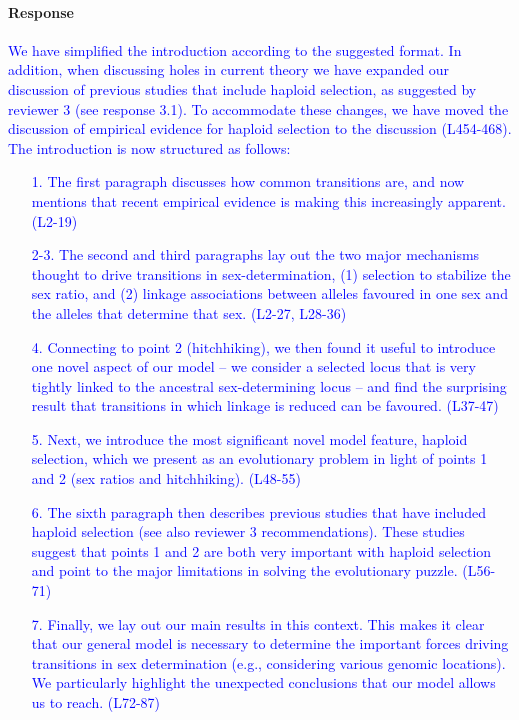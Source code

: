 \documentclass[10pt,letterpaper]{article}
\begin{document}
\noindent\paragraph{Response}
\textcolor{blue}{
We have simplified the introduction according to the suggested format. In addition, when discussing holes in current theory we have expanded our discussion of previous studies that include haploid selection, as suggested by reviewer 3 (see response 3.1). 
To accommodate these changes, we have moved the discussion of empirical evidence for haploid selection to the discussion (L454-468). The introduction is now structured as follows:
\begin{enumerate}
\item[1.]{The first paragraph discusses how common transitions are, and now mentions that recent empirical evidence is making this increasingly apparent. (L2-19)}
\item[2-3.]{The second and third paragraphs lay out the two major mechanisms thought to drive transitions in sex-determination, (1) selection to stabilize the sex ratio, and (2) linkage associations between alleles favoured in one sex and the alleles that determine that sex. (L2-27, L28-36) }
\item[4.]{Connecting to point 2 (hitchhiking), we then found it useful to introduce one novel aspect of our model -- we consider a selected locus that is very tightly linked to the ancestral sex-determining locus -- and find the surprising result that transitions in which linkage is reduced can be favoured. (L37-47)}
\item[5.]{Next, we introduce the most significant novel model feature, haploid selection, which we present as an evolutionary problem in light of points 1 and 2 (sex ratios and hitchhiking). (L48-55) }
\item[6.]{The sixth paragraph then describes previous studies that have included haploid selection (see also reviewer 3 recommendations). These studies suggest that points 1 and 2 are both very important with haploid selection and point to the major limitations in solving the evolutionary puzzle. (L56-71)}
\item[7.]{Finally, we lay out our main results in this context. This makes it clear that our general model is necessary to determine the important forces driving transitions in sex determination (e.g., considering various genomic locations). We particularly highlight the unexpected conclusions that our model allows us to reach. (L72-87)}
\end{enumerate}
}
\end{document}
